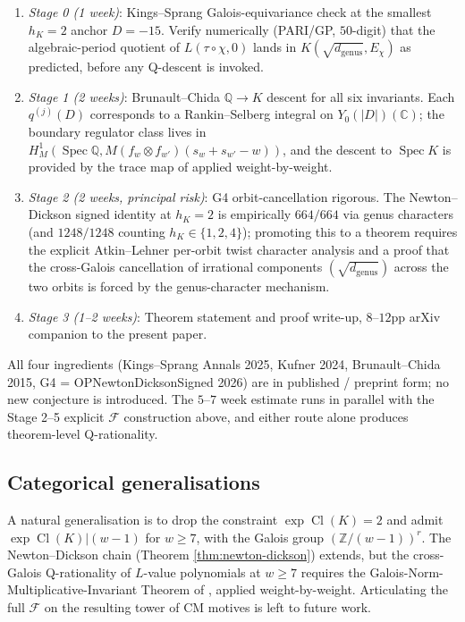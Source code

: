 \documentclass[11pt]{amsart}
\theoremstyle{definition}
\theoremstyle{remark}
\DeclareMathOperator{\Cl}{Cl}
\DeclareMathOperator{\Spec}{Spec}
\newcommand{\Q}{\mathbb{Q}}
\newcommand{\Z}{\mathbb{Z}}
\newcommand{\C}{\mathbb{C}}
\begin{document}
\begin{enumerate}
\item \emph{Stage 0 (1 week)}: Kings--Sprang Galois-equivariance
check at the smallest $h_K = 2$ anchor $D = -15$. Verify
numerically (PARI/GP, $50$-digit) that the algebraic-period quotient
of $L(\tau \circ \chi, 0)$ lands in
$K(\sqrt{d_{\mathrm{genus}}}, E_\chi)$ as predicted, before any
Q-descent is invoked.

\item \emph{Stage 1 (2 weeks)}: Brunault--Chida $\Q \to K$ descent
for all six invariants. Each $q^{(j)}(D)$ corresponds to a
Rankin--Selberg integral on $Y_0(|D|)(\C)$; the boundary regulator
class lives in $H^1_M(\Spec \Q, M(f_w \otimes f_{w'})(s_w + s_{w'} - w))$,
and the descent to $\Spec K$ is provided by the trace map of
\cite[\S 3]{BrunaultChida2015} applied weight-by-weight.

\item \emph{Stage 2 (2 weeks, principal risk)}: G4 orbit-cancellation
rigorous. The Newton--Dickson signed identity at $h_K = 2$ is
empirically $664/664$ via genus characters (and $1248/1248$ counting
$h_K \in \{1, 2, 4\}$); promoting this to a theorem requires the
explicit Atkin--Lehner per-orbit twist character analysis and a
proof that the cross-Galois cancellation of irrational components
$(\sqrt{d_{\mathrm{genus}}})$ across the two orbits is forced by
the genus-character mechanism.

\item \emph{Stage 3 (1--2 weeks)}: Theorem statement and proof
write-up, $8$--$12$pp arXiv companion to the present paper.
\end{enumerate}

All four ingredients (Kings--Sprang Annals 2025, Kufner 2024,
Brunault--Chida 2015, G4 = OPNewtonDicksonSigned 2026) are in
published / preprint form; no new conjecture is introduced. The
$5$--$7$ week estimate runs in parallel with the Stage 2--5 explicit
$\mathcal{F}$ construction above, and either route alone produces
theorem-level Q-rationality.

\subsection{Categorical generalisations}\label{ss:open-categorical}

A natural generalisation is to drop the constraint $\exp\Cl(K) = 2$
and admit $\exp\Cl(K) | (w - 1)$ for $w \ge 7$, with the Galois group
$(\Z/(w-1))^{r}$. The Newton--Dickson chain (Theorem
\ref{thm:newton-dickson}) extends, but the cross-Galois Q-rationality
of $L$-value polynomials at $w \ge 7$ requires the
Galois-Norm-Multiplicative-Invariant Theorem of
\cite{Paper_P4_2026-05-17}, applied weight-by-weight. Articulating
the full $\mathcal{F}$ on the resulting tower of CM motives is left
to future work.
\end{document}
